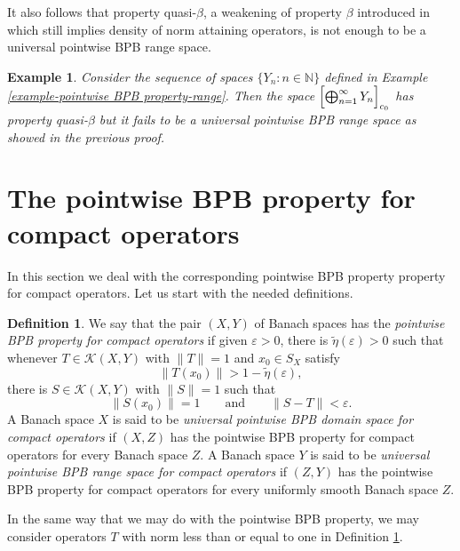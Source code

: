 \documentclass[a4paper,10pt]{amsart}
\theoremstyle{plain}
\theoremstyle{definition}
\newtheorem{example}[theorem]{Example}
\newtheorem{definition}[theorem]{Definition}
\newcommand{\N}{\mathbb{N}}
\newcommand{\eps}{\varepsilon}
\begin{document}
It also follows that property quasi-$\beta$, a weakening of property $\beta$ introduced in \cite{AAP} which still implies density of norm attaining operators, is not enough to be a universal pointwise BPB range space.

\begin{example}
{\slshape Consider the sequence of spaces $\{Y_n\colon n\in \N\}$ defined in Example \ref{example-pointwise BPB property-range}. Then the space $\Bigl[\bigoplus_{n=1}^\infty Y_n\Bigr]_{c_0}$ has property quasi-$\beta$ \cite[Proposition 4]{AAP} but it fails to be a universal pointwise BPB range space as showed in the previous proof.}
\end{example}



\section{The pointwise BPB property for compact operators}\label{sect:compact}

In this section we deal with the corresponding pointwise BPB property property for compact operators. Let us start with the needed definitions.

\begin{definition} \label{pointwise BPB property:comp:def}
We say that the pair $(X, Y)$ of Banach spaces has the \emph{pointwise BPB property for compact operators} if given $\eps > 0$, there is $\tilde\eta(\eps) > 0$ such that whenever $T \in \mathcal{K}(X, Y)$ with $\|T\| = 1$ and $x_0 \in S_X$ satisfy
	\begin{equation*}
	\|T(x_0)\| > 1 - \tilde\eta(\eps),	
	\end{equation*}
there is $S \in \mathcal{K}(X, Y)$ with $\|S\| = 1$ such that
\begin{equation*}
\|S(x_0)\| = 1 \qquad \text{and} \qquad \|S - T\| < \eps.
\end{equation*}
A Banach space $X$ is said to be \emph{universal pointwise BPB domain space for compact operators} if $(X,Z)$ has the pointwise BPB property for compact operators for every Banach space $Z$. A Banach space $Y$ is said to be \emph{universal pointwise BPB range space for compact operators} if $(Z,Y)$ has the pointwise BPB property for compact operators for every uniformly smooth Banach space $Z$.
\end{definition}

In the same way that we may do with the pointwise BPB property, we may consider operators $T$ with norm less than or equal to one in Definition \ref{pointwise BPB property:comp:def}.
\end{document}

